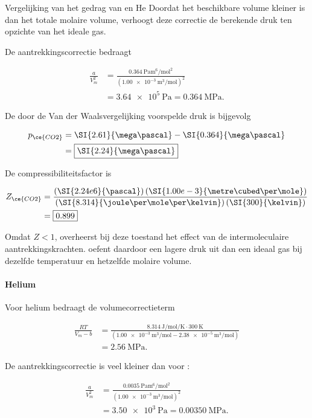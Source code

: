 \begin{voorbeeld}{Vergelijking van het gedrag van  en He}
Doordat het beschikbare volume kleiner is dan het totale molaire volume, verhoogt deze correctie de berekende druk ten opzichte van het ideale gas.

De aantrekkingscorrectie bedraagt

\begin{align*}
\frac{a}{V_m^2}
&= \frac{\SI{0.364}{\pascal\metre\tothe{6}\per\mole\squared} }{ \left( \SI{1.00e-3}{\metre\cubed\per\mole} \right)^2 } \\
&= \SI{3.64e5}{\pascal} = \SI{0.364}{\mega\pascal}.
\end{align*}

De door de Van der Waalsvergelijking voorspelde druk is bijgevolg

\begin{align*}
p_{\ce{CO2}}
&= \SI{2.61}{\mega\pascal} - \SI{0.364}{\mega\pascal} \\
&= \boxed{\SI{2.24}{\mega\pascal}}
\end{align*}

De compressibiliteitsfactor is

\begin{align*}
Z_{\ce{CO2}}
&= \frac{ \left(\SI{2.24e6}{\pascal}\right) \left(\SI{1.00e-3}{\metre\cubed\per\mole}\right) }{ \left(\SI{8.314}{\joule\per\mole\per\kelvin}\right) \left(\SI{300}{\kelvin}\right) } \\
&= \boxed{0.899}
\end{align*}

Omdat \(Z<1\), overheerst bij deze toestand het effect van de
intermoleculaire aantrekkingskrachten.  oefent daardoor een lagere
druk uit dan een ideaal gas bij dezelfde temperatuur en hetzelfde molaire
volume.

\paragraph{Helium}

Voor helium bedraagt de volumecorrectieterm

\begin{align*}
\frac{RT}{V_m-b}
&=
\frac{
\SI{8.314}{\joule\per\mole\per\kelvin}
\cdot
\SI{300}{\kelvin}
}{
\left(
\SI{1.00e-3}{\metre\cubed\per\mole}
-
\SI{2.38e-5}{\metre\cubed\per\mole}
\right)
}
\\
&=
\SI{2.56}{\mega\pascal}.
\end{align*}

De aantrekkingscorrectie is veel kleiner dan voor :

\begin{align*}
\frac{a}{V_m^2}
&=
\frac{
\SI{0.0035}{\pascal\metre\tothe{6}\per\mole\squared}
}{
\left(
\SI{1.00e-3}{\metre\cubed\per\mole}
\right)^2
}
\\
&=
\SI{3.50e3}{\pascal}
=
\SI{0.00350}{\mega\pascal}.
\end{align*}


\end{voorbeeld}
